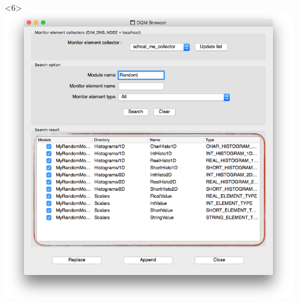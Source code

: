 \documentclass[8pt]{beamer}
\begin{document}
\begin{frame}
\begin{overlayarea}{\textwidth}{\textheight}
\begin{columns}
\begin{center}
         \begin{onlyenv}<6>\includegraphics[width=1.1\textwidth]{figs/Browser/Browser_SearchResult}\end{onlyenv}
               \end{center}

         \begin{itemize}
      \end{itemize}

           \end{columns}
               \end{overlayarea}
    
  \end{frame}
  
\end{document}
